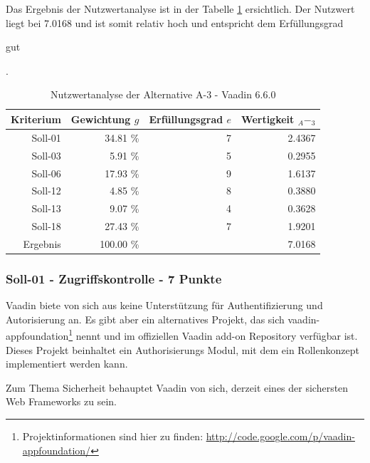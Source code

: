   Das Ergebnis der Nutzwertanalyse ist in der Tabelle \ref{tab:nwaA3}
  ersichtlich. Der Nutzwert liegt bei 7.0168 und ist somit relativ hoch und
  entspricht dem Erfüllungsgrad \begin{itshape}gut\end{itshape}.
    
  \begin{table}[ht]
    \sffamily 
    \begin{center}
      \begin{tabular}{r|rrr}
        \toprule
        \textbf{Kriterium} & \textbf{Gewichtung \(g\)} & \textbf{Erfüllungsgrad
        \(e\)} & \textbf{Wertigkeit \(_A-_3\)} \\
        \midrule
        Soll-01   & 34.81 \% & 7 & 2.4367 \\
        Soll-03   &  5.91 \% & 5 & 0.2955 \\
        Soll-06   & 17.93 \% & 9 & 1.6137 \\
        Soll-12   &  4.85 \% & 8 & 0.3880 \\
        Soll-13   &  9.07 \% & 4 & 0.3628 \\
        Soll-18   & 27.43 \% & 7 & 1.9201 \\
        \midrule
        \midrule
        Ergebnis  & 100.00 \% &   & 7.0168 \\
        \bottomrule
      \end{tabular}
      \caption{Nutzwertanalyse der Alternative A-3 - Vaadin 6.6.0}
      \label{tab:nwaA3}
    \end{center}
  \end{table}
  
  \subsubsection{Soll-01 - Zugriffskontrolle - 7 Punkte}
  
  Vaadin biete von sich aus keine Unterstützung für Authentifizierung und
  Autorisierung an. Es gibt aber ein alternatives Projekt, das sich
  vaadin-appfoundation\footnote{Projektinformationen sind hier zu finden:
  \url{http://code.google.com/p/vaadin-appfoundation/}} nennt und im
  offiziellen Vaadin add-on Repository verfügbar ist. Dieses Projekt beinhaltet
  ein Authorisierungs Modul, mit dem ein Rollenkonzept implementiert werden kann.
  
  Zum Thema Sicherheit behauptet Vaadin von sich, derzeit eines der sichersten
  Web Frameworks zu sein.
  
